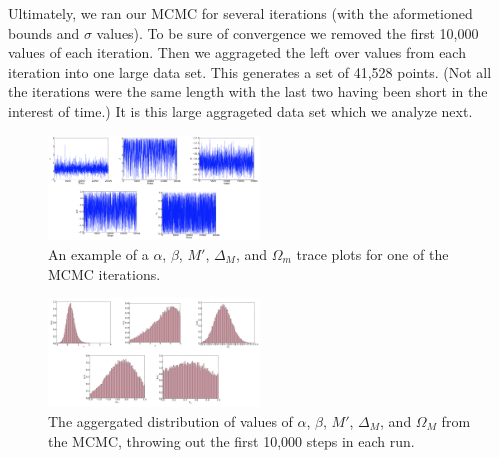 \documentclass[aps,prl,reprint]{revtex4-1}
\begin{document}
Ultimately, we ran our MCMC for several iterations (with the aformetioned bounds and $\sigma$ values). To be sure of convergence we removed the first 10,000 values of each iteration. Then we aggrageted the left over values from each iteration into one large data set. This generates a set of 41,528 points. (Not all the iterations were the same length with the last two having been short in the interest of time.) It is this large aggrageted data set which we analyze next.
\begin{figure}
 \includegraphics[width=0.5\textwidth]{../plots/SN_trace.pdf}
\caption{\label{fig:trace}An example of a $\alpha$, $\beta$, $M'$, $\Delta_M$, and $\Omega_m$ trace plots for one of the MCMC iterations.}
\end{figure}

\begin{figure}
\includegraphics[width=0.5\textwidth]{../plots/SN_hist.pdf}
\caption{\label{fig:hist}The aggergated distribution of values of $\alpha$, $\beta$, $M'$, $\Delta_M$, and $\Omega_M$ from the MCMC, throwing out the first 10,000 steps in each run.}
\end{figure}
\end{document}
